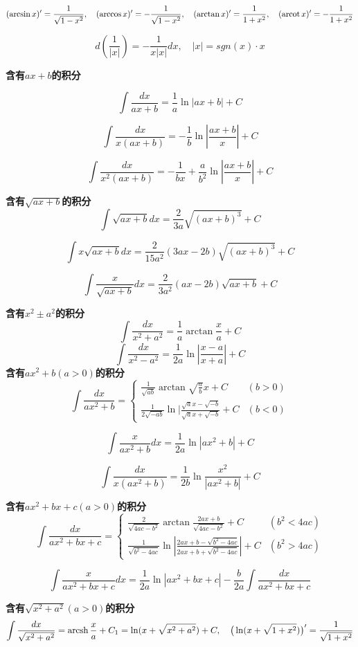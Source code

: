 \documentclass{book}
\begin{document}
$$
(\arcsin x)'=\frac{1}{\sqrt{1-x^2}}, \quad
(\arccos x)'=-\frac{1}{\sqrt{1-x^2}}, \quad
(\arctan x)'=\frac{1}{1+x^2}, \quad
(\operatorname{arcot} x)'=-\frac{1}{1+x^2}
$$

$$
d(\frac{1}{|x|})=-\frac{1}{x|x|}dx, \quad |x|=sgn(x)\cdot x
$$

\textbf{含有$ax+b$的积分}

$$
\int \frac{dx}{ax+b}=\frac{1}{a}\ln|ax+b|+C
$$

$$
\int \frac{dx}{x(ax+b)}=-\frac{1}{b}\ln|\frac{ax+b}{x}|+C
$$

$$
\int \frac{dx}{x^2(ax+b)}=-\frac{ 1}{bx}+\frac{ a}{b^2}\ln |\frac{ax+b}{x}|+C
$$

\textbf{含有$\sqrt{ax+b}$的积分}
$$
\int \sqrt{ax+b}dx=\frac{2}{3a}\sqrt{(ax+b)^3}+C
$$

$$
\int x\sqrt{ax+b}dx=\frac{2}{15a^2}(3ax-2b)\sqrt{(ax+b)^3}+C
$$

$$
\int \frac{x}{\sqrt{ax+b}}dx=\frac{2}{3a^2}(ax-2b)\sqrt{ax+b}+C
$$

\textbf{含有$x^2 \pm a^2$的积分}
$$
\int \frac{dx}{x^2+a^2}=\frac{1}{a}\arctan \frac{x}{a}+C
$$
$$
\int \frac{dx}{x^2-a^2}=\frac{1}{2a}\ln |\frac{x-a}{x+a}|+C
$$
\textbf{含有$ax^2+b(a>0)$的积分}
$$
\int \frac{dx}{ax^2+b}=
\left\{
		\begin{array}{ll}
			\frac{1}{\sqrt{ab}}\arctan \sqrt{\frac{a}{b}}x+C & (b>0) \\
			\frac{1}{2\sqrt{-ab}}\ln|\frac{\sqrt{a}x-\sqrt{-b}}{\sqrt{a}x+\sqrt{-b}}+C & (b<0)
		\end{array}
		\right.
$$

$$
\int \frac{x}{ax^2+b}dx=\frac{1}{2a}\ln |ax^2+b|+C
$$

$$
\int \frac{dx}{x(ax^2+b)}=\frac{1}{2b}\ln \frac{x^2}{|ax^2+b|}+C
$$

\textbf{含有$ax^2+bx+c(a>0)$的积分}
$$
\int \frac{ dx}{ax^2+bx+c}=
\left\{
		\begin{array}{ll}
		 \frac{2}{\sqrt{4ac-b^2}}\arctan \frac{2ax+b}{\sqrt{4ac-b^2}}+C & (b^2<4ac) \\
		 \frac{1}{\sqrt{b^2-4ac}}\ln|\frac{2ax+b-\sqrt{b^2-4ac}}{2ax+b+\sqrt{b^2-4ac}}|+C & (b^2>4ac)
		\end{array}
		\right.
$$

$$
\int \frac{x}{ax^2+bx+c}dx=\frac{1}{2a}\ln|ax^2+bx+c|-\frac{b}{2a}\int \frac{dx}{ax^2+bx+c}
$$

\textbf{含有$\sqrt{x^2+a^2}(a>0)$的积分}
$$
\int \frac{dx}{\sqrt{x^2+a^2}}=\operatorname{arcsh} \frac{x}{a}+C_1=\ln(x+\sqrt{x^2+a^2})+C,\quad \big( \ln(x+\sqrt{1+x^2})\big)'=\frac{1}{\sqrt{1+x^2}}
$$
\end{document}
